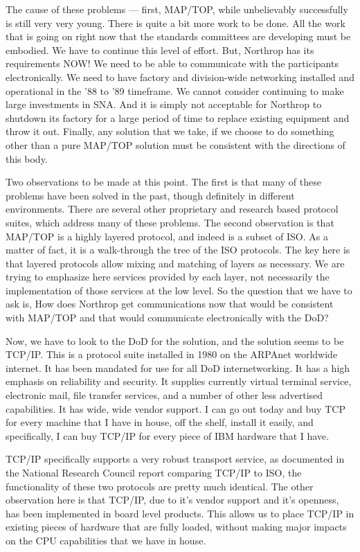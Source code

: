 The cause of these problems --- first, MAP/TOP, while unbelievably
successfully is still very very young.  There is quite a bit more work
to be done.  All the work that is going on right now that the standards
committees are developing must be embodied.  We have to continue this
level of effort.  But, Northrop has its requirements NOW!  We need to
be able to communicate with the participants electronically.  We need to
have factory and division-wide networking installed and operational in
the '88 to '89 timeframe.  We cannot consider continuing to make large
investments in SNA.  And it is simply not acceptable for Northrop to
shutdown its factory for a large period of time to replace existing
equipment and throw it out.  Finally, any solution that we take, if we
choose to do something other than a pure MAP/TOP solution must be
consistent with the directions of this body.

Two observations to be made at this point.  The first is that many of
these problems have been solved in the past, though definitely in
different environments.  There are several other proprietary and research
based protocol suites, which address many of these problems.  The second
observation is that MAP/TOP is a highly layered protocol, and indeed is
a subset of ISO.  As a matter of fact, it is a walk-through the tree
of the ISO protocols.  The key here is that layered protocols allow mixing
and matching of layers as necessary.  We are trying to emphasize here
services provided by each layer, not necessarily the implementation
of those services at the low level.  So the question that we have to ask is,
How does Northrop get communications now that would be consistent with
MAP/TOP and that would communicate electronically with the DoD?

Now, we have to look to the DoD for the solution, and the solution seems
to be TCP/IP.  This is a protocol suite installed in 1980 on the ARPAnet
worldwide internet.  It has been mandated for use for all DoD
internetworking.  It has a high emphasis on reliability and security.
It supplies currently virtual terminal service, electronic mail, file
transfer services, and a number of other less advertised capabilities.
It has wide, wide vendor support.  I can go out today and buy TCP for
every machine that I have in house, off the shelf, install it easily,
and specifically, I can buy TCP/IP for every piece of IBM hardware that I
have.

TCP/IP specifically supports a very robust transport service, as documented
in the National Research Council report comparing TCP/IP to ISO, the
functionality of these two protocols are pretty much identical.  The other
observation here is that TCP/IP, due to it's vendor support and it's
openness, has been implemented in board level products.  This allows us
to place TCP/IP in existing pieces of hardware that are fully loaded,
without making major impacts on the CPU capabilities that we have in house.

